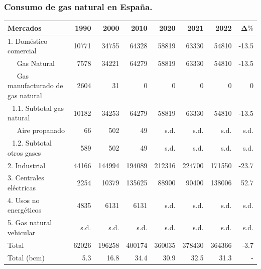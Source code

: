 		\subsubsection{Consumo de gas natural en España.}
			\begin{table}[H]
				\centering
				\renewcommand{\arraystretch}{1.2}
				\begin{tabular}{lrrrrrrr}
					\hline
					\textbf{Mercados} & \textbf{1990} & \textbf{2000} & \textbf{2010} & \textbf{2020} & \textbf{2021} & \textbf{2022} & $\mathbf{\Delta \%}$ \\
					\hline
					1. Doméstico comercial						& 10771 & 34755 & 64328 & 58819 & 63330 & 54810 & -13.5\\
					$\,\,\,\,\,\,$ Gas Natural						& 7578  & 34221 & 64279 & 58819 & 63330 & 54810 & -13.5\\
					$\,\,\,\,\,\,$ Gas manufacturado de gas natural	& 2604  & 31    & 0     & 0     & 0     & 0     & 0    \\
					$\,\,$ 1.1. Subtotal gas natural			& 10182 & 34253 & 64279 & 58819 & 63330 & 54810 & -13.5\\
					$\,\,\,\,\,\,$ Aire propanado					& 66    & 502   & 49    & s.d.  & s.d.  & s.d.  & s.d. \\
					$\,\,$ 1.2. Subtotal otros gases			& 589   & 502   & 49    & s.d.  & s.d.  & s.d.  & s.d. \\
					2. Industrial								& 44166 & 144994& 194089& 212316& 224700& 171550& -23.7\\
					3. Centrales eléctricas						& 2254  & 10379 & 135625& 88900 & 90400 & 138006& 52.7 \\
					4. Usos no energéticos						& 4835  & 6131  & 6131  & s.d.  & s.d.  & s.d.  & s.d. \\
					5. Gas natural vehicular					& s.d.  & s.d.  & s.d.  & s.d.  & s.d.  & s.d.  & s.d. \\
					\hline
					Total										& 62026 & 196258& 400174& 360035& 378430& 364366& -3.7\\
					Total (bcm)									& 5.3   & 16.8  & 34.4  & 30.9  & 32.5  & 31.3  & -   \\
					\hline
				\end{tabular}
			\end{table}
			
